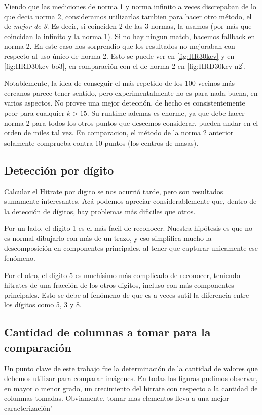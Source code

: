 Viendo que las mediciones de norma 1 y norma infinito a veces discrepaban de lo que
decia norma 2, consideramos utilizarlas tambien para hacer otro m\'etodo, el de \textit{mejor
de 3}. Es decir, si coinciden 2 de las 3 normas, la usamos (por m\'as que coincidan la
infinito y la norma 1). Si no hay ningun match, hacemos fallback en norma 2. En este caso
nos sorprendio que los resultados no mejoraban con respecto al uso \'unico de norma 2.
Esto se puede ver en \ref{fig:HR30kcv} y en \ref{fig:HRD30kcv-bo3}, en comparaci\'on con
el de norma 2 en \ref{fig:HRD30kcv-n2}.

Notablemente, la idea de conseguir el m\'as repetido de los 100 vecinos m\'as cercanos
parece tener sentido, pero experimentalmente no es para nada buena, en varios aspectos.
No provee una mejor detecci\'on, de hecho es consistentemente peor para cualquier $k>15$.
Su runtime ademas es enorme, ya que debe hacer norma 2 para todos los otros puntos que
deseemos considerar, pueden andar en el orden de miles tal vez. En comparacion, el m\'etodo
de la norma 2 anterior solamente comprueba contra 10 puntos (los centros de masas).


\subsection{Detecci\'on por d\'igito}
Calcular el Hitrate por digito se nos ocurri\'o tarde, pero son resultados
sumamente interesantes. Ac\'a podemos apreciar considerablemente que, dentro de
la detecci\'on de d\'igitos, hay problemas m\'as dificiles que otros.

Por un lado, el digito 1 es el m\'as facil de reconocer. Nuestra hip\'otesis
es que no es normal dibujarlo con m\'as de un trazo, y eso simplifica mucho la
descomposici\'on en componentes principales, al tener que capturar unicamente ese
fen\'omeno.

Por el otro, el digito 5 es much\'isimo m\'as complicado de reconocer, teniendo
hitrates de una fracci\'on de los otros digitos, incluso con m\'as componentes
principales. Esto se debe al fen\'omeno de que es a veces sut\'il la diferencia
entre los d\'igitos como 5, 3 y 8.


\subsection{Cantidad de columnas a tomar para la comparaci\'on}
Un punto clave de este trabajo fue la determinaci\'on de la cantidad de valores que debemos
utilizar para comparar im\'agenes. En todas las figuras pudimos observar, en mayor o menor
grado, un crecimiento del hitrate con respecto a la cantidad de columnas tomadas.
Obviamente, tomar mas elementos lleva a una mejor caracterizaci\'on'


